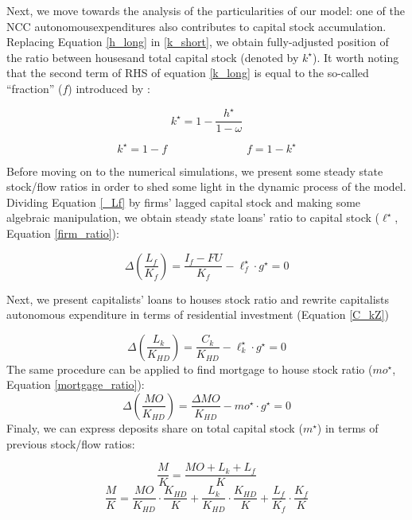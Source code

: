 \documentclass[11pt]{article}
\begin{document}
Next, we move towards the analysis of the particularities of our model:  one of the NCC autonomousexpenditures also contributes to capital stock accumulation.  
Replacing Equation \ref{h_long} in \ref{k_short}, we obtain fully-adjusted position of the ratio between housesand total capital stock (denoted by \(k^\star\)). It worth noting that the second term of RHS of equation \ref{k_long} is equal to the so-called ``fraction'' (\(f\)) introduced by \textcite{serrano_long_1995}:

\begin{equation}
\label{k_long}
k^{\star} = 1 - \frac{h^{\star}}{1-\omega}
\end{equation}

$$
k^{\star} = 1 - f \hspace{3cm} f = 1 - k^{\star}
$$


Before moving on to the numerical simulations, we present some steady state stock/flow ratios in order to shed some light in the dynamic process of the model. Dividing Equation \ref{_Lf} by firms' lagged capital stock and making some algebraic manipulation, we obtain steady state loans' ratio to capital stock (\(\ell^{\star}\), Equation \ref{firm_ratio}):

$$
\Delta \left(\frac{L_{f}}{K_{f}}\right) = \frac{I_{f} - FU}{K_{f}} - \ell^{\star}_{f}\cdot g^{\star}  = 0
$$

Next, we present capitalists' loans to houses stock ratio and  rewrite capitalists autonomous expenditure in terms of residential investment (Equation \ref{C_kZ})

$$
\Delta \left(\frac{L_k}{K_{HD}}\right) = \frac{C_k}{K_{HD}} - \ell^{\star}_{k}\cdot g^{\star} = 0
$$
The same procedure can be applied to find mortgage to house stock ratio (\(mo^{\star}\), Equation \ref{mortgage_ratio}):
$$
\Delta \left(\frac{MO}{K_{HD}}\right) = \frac{\Delta MO}{K_{HD}} - mo^{\star}\cdot g^{\star} = 0
$$
Finaly, we can express deposits share on total capital stock (\(m^{\star}\)) in terms of previous stock/flow ratios:

$$
\frac{M}{K} = \frac{MO + L_k + L_f}{K}
$$
$$
\frac{M}{K} = \frac{MO}{K_{HD}}\cdot \frac{K_{HD}}{K} +  \frac{L_k}{K_{HD}}\cdot \frac{K_{HD}}{K} +  \frac{L_f}{K_{f}}\cdot \frac{K_{f}}{K}
$$
\end{document}
